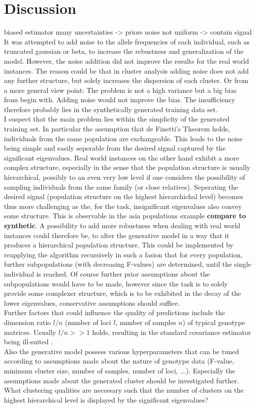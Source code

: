 \documentclass[a4paper, 11pt]{article}
\begin{document}
\section{Discussion}
biased estimator
many uncertainties -> priors
noise not uniform -> contain signal
It was attempted to add noise to the allele frequencies of each individual, such as truncated gaussian or beta, to increase the rebustness and generalization of the model. However, the noise addition did not improve the results for the real world instances. The reason could be that in cluster analysis adding noise does not add any further structure, but solely increases the dispersion of each cluster. Or from a more general view point: The problem is not a high variance but a big bias from begin with. Adding noise would not improve the bias. The insufficiency therefore probably lies in the synthetically generated training data set.\\
I suspect that the main problem lies within the simplicity of the generated training set. In particular the assumption that de Finetti's Theorem holds, individuals from the same population are exchangeable. This leads to the noise being simple and easily seperable from the desired signal captured by the significant eigenvalues. Real world instances on the other hand exhibit a more complex structure, especially in the sense that the population structure is usually hierarchical, possibly to an even very low level if one considers the possibility of sampling individuals from the same family (or close relatives). Seperating the desired signal (population structure on the highest hierarchichal level) becomes thus more challenging as the, for the task, insignificant eigenvalues also convey some structure. This is observable in the asia populations example \textbf{compare to synthetic}. A possibility to add more robustness when dealing with real world instances could therefore be, to alter the generative model in a way that it produces a hierarchical population structure. This could be implemented by reapplying the algorithm recursively in such a fasion that for every population, further subpopulations (with decreasing F-values) are determined, until the single individual is reached. Of course further prior assumptions about the subpopulations would have to be made, however since the task is to solely provide some complexer structure, which is to be exhibited in the decay of the lower eigenvalues, conservative assumptions should suffice.\\
Further factors that could influence the quality of predictions include the dimension ratio $l/n$ (number of loci $l$, number of samples $n$) of typical genotype matrices. Usually $l/n >> 1$ holds, resulting in the standard covariance estimator being ill-suited \parencite{ledoit2004well, schafer2005shrinkage}.\\
Also the generative model possess various hyperparameters that can be tuned according to assumptions made about the nature of genotype data (F-value, minimum cluster size, number of samples, number of loci, ...). Especially the assumptions made about the generated cluster should be investigated further. What clustering qualities are necessary such that the number of clusters on the highest hierarchical level is displayed by the significant eigenvalues?

\printbibliography
\end{document}
